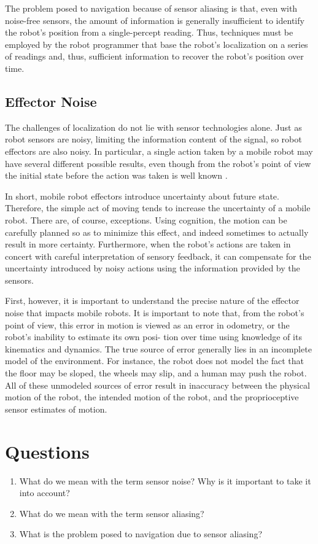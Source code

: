 The problem posed to navigation because of sensor aliasing is that, even with noise-free
sensors, the amount of information is generally insufficient to identify the robot’s position
from a single-percept reading. Thus, techniques must be employed by the robot programmer that base the robot’s 
localization on a series of readings and, thus, sufficient information to recover the robot’s position over time.


\subsection{Effector Noise}
\label{effector_noise}

The challenges of localization do not lie with sensor technologies alone. Just as robot sensors are noisy, 
limiting the information content of the signal, so robot effectors are also
noisy. In particular, a single action taken by a mobile robot may have several different possible results, 
even though from the robot’s point of view the initial state before the action
was taken is well known \cite{Siegwart2011}.

In short, mobile robot effectors introduce uncertainty about future state. Therefore, the
simple act of moving tends to increase the uncertainty of a mobile robot. There are, of
course, exceptions. Using cognition, the motion can be carefully planned so as to minimize
this effect, and indeed sometimes to actually result in more certainty. Furthermore, when
the robot’s actions are taken in concert with careful interpretation of sensory feedback, it
can compensate for the uncertainty introduced by noisy actions using the information provided by the sensors.

First, however, it is important to understand the precise nature of the effector noise that
impacts mobile robots. It is important to note that, from the robot’s point of view, this error
in motion is viewed as an error in odometry, or the robot’s inability to estimate its own posi-
tion over time using knowledge of its kinematics and dynamics. The true source of error
generally lies in an incomplete model of the environment. For instance, the robot does not
model the fact that the floor may be sloped, the wheels may slip, and a human may push
the robot. All of these unmodeled sources of error result in inaccuracy between the physical
motion of the robot, the intended motion of the robot, and the proprioceptive sensor estimates of motion.


\section{Questions}


\begin{enumerate}
\item What do we mean with the term sensor noise? Why is it important to take it into account? 
\item What do we mean with the term sensor aliasing?
\item What is the problem posed to navigation due to sensor aliasing?
\end{enumerate}
 
